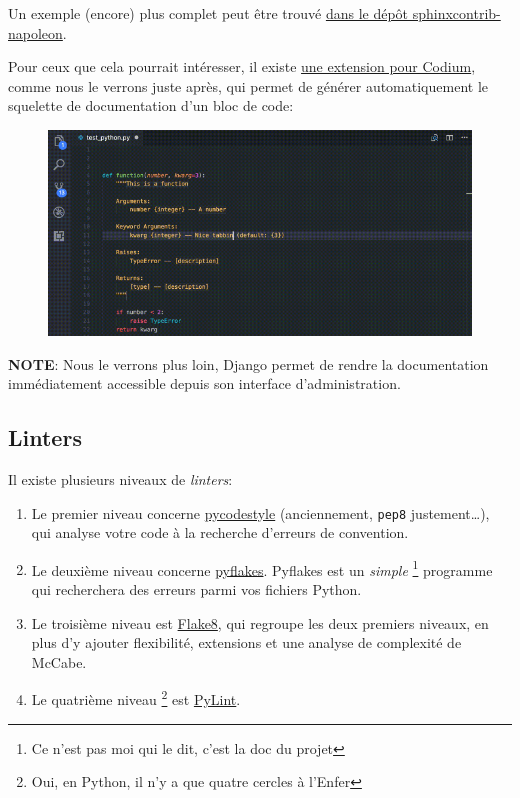 \documentclass[11pt]{amsbook}
\newcommand{\admonition}[2]{\textbf{#1}: {#2}}
\begin{document}
Un exemple (encore) plus complet peut être trouvé \href{https://sphinxcontrib-napoleon.readthedocs.io/en/latest/example_google.html#example-google}{dans le dépôt sphinxcontrib-napoleon}.


Pour ceux que cela pourrait intéresser, il existe \href{https://marketplace.visualstudio.com/items?itemName=njpwerner.autodocstring}{une extension pour Codium}, comme nous le verrons juste après, qui permet de générer automatiquement le squelette de documentation d’un bloc de code:


\begin{figure}[h]{}
\centering\includegraphics{images/environment/python-docstring-vscode.png}
\caption{}

\end{figure}

\admonition{NOTE}{Nous le verrons plus loin, Django permet de rendre la documentation immédiatement accessible depuis son interface d’administration.}
\hypertarget{x-linters}{\subsection{Linters}}
Il existe plusieurs niveaux de \emph{linters}:


\begin{enumerate}

\item{Le premier niveau concerne \href{https://pypi.org/project/pycodestyle/}{pycodestyle} (anciennement, \texttt{pep8} justement…​), qui analyse votre code à la recherche d’erreurs de convention.}

\item{Le deuxième niveau concerne \href{https://pypi.org/project/pyflakes/}{pyflakes}. Pyflakes est un \emph{simple} \footnote{Ce n’est pas moi qui le dit, c’est la doc du projet} programme qui recherchera des erreurs parmi vos fichiers Python.}

\item{Le troisième niveau est \href{https://pypi.org/project/flake8/}{Flake8}, qui regroupe les deux premiers niveaux, en plus d’y ajouter flexibilité, extensions et une analyse de complexité de McCabe.}

\item{Le quatrième niveau \footnote{Oui, en Python, il n’y a que quatre cercles à l’Enfer} est \href{https://pylint.org/}{PyLint}.}

\end{enumerate}
\end{document}
